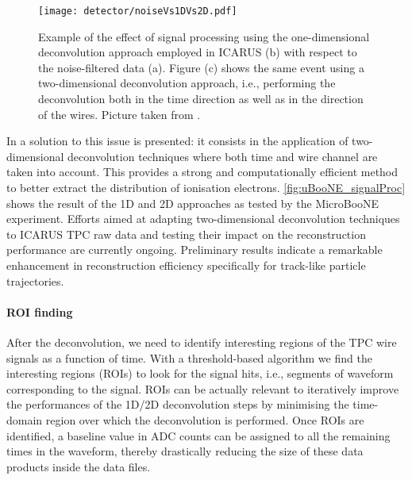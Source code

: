 \begin{figure}
    \centering
    \texttt{[image: detector/noiseVs1DVs2D.pdf]}
    \caption[TPC signal processing]{Example of the effect of signal processing using the one-dimensional deconvolution approach employed in ICARUS (b) with respect to the noise-filtered data (a). Figure (c) shows the same event using a two-dimensional deconvolution approach, i.e., performing the deconvolution both in the time direction as well as in the direction of the wires. Picture taken from \cite{MicroBooNE:2018swd}. }
    \label{fig:uBooNE_signalProc}
\end{figure}

In \cite{MicroBooNE:2018swd,MicroBooNE:2018vro} a solution to this issue is presented: it consists in the application of two-dimensional deconvolution techniques where both time and wire channel are taken into account. This provides a strong and computationally efficient method to better extract the distribution of ionisation electrons. \autoref{fig:uBooNE_signalProc} shows the result of the 1D and 2D approaches as tested by the MicroBooNE experiment. Efforts aimed at adapting two-dimensional deconvolution techniques to ICARUS TPC raw data and testing their impact on the reconstruction performance are currently ongoing. Preliminary results indicate a remarkable enhancement in reconstruction efficiency specifically for track-like particle trajectories.

\paragraph{ROI finding} After the deconvolution, we need to identify interesting regions of the TPC wire signals as a function of time. With a threshold-based algorithm we find the interesting regions (ROIs) to look for the signal hits, i.e., segments of waveform corresponding to the signal. ROIs can be actually relevant to iteratively improve the performances of the 1D/2D deconvolution steps by minimising the time-domain region over which the deconvolution is performed. Once ROIs are identified, a baseline value in ADC counts can be assigned to all the remaining times in the waveform, thereby drastically reducing the size of these data products inside the data files. 

